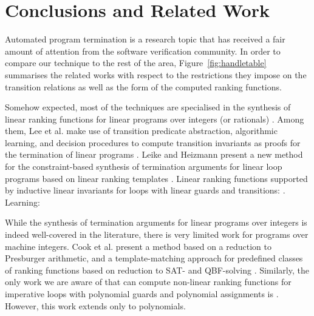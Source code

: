 \documentclass[preprint]{sigplanconf}
\theoremstyle{definition}
\begin{document}
 \section{Conclusions and Related Work}
Automated program termination is a research topic that has received a fair amount of attention from the software verification community.
In order to compare our technique to the rest of the area, 
Figure~\ref{fig:handletable} summarises the related works with respect to the restrictions they impose on the transition relations as well as the form of the computed ranking functions. 


Somehow expected, most of the techniques are specialised in the synthesis of linear ranking functions for linear programs over integers (or rationals) \cite{DBLP:conf/pldi/CookPR06,DBLP:conf/cav/LeeWY12,DBLP:conf/popl/Ben-AmramG13,DBLP:conf/vmcai/P04,DBLP:conf/atva/HeizmannHLP13,DBLP:conf/cav/BradleyMS05,DBLP:conf/tacas/CookSZ13}. 
Among them, 
Lee et al. make use of transition predicate abstraction, algorithmic learning, and decision procedures to compute transition
invariants as proofs for the termination of linear programs \cite{DBLP:conf/cav/LeeWY12}.
Leike and Heizmann present a new method for the constraint-based synthesis
of termination arguments for linear loop programs based on
linear ranking templates \cite{DBLP:conf/tacas/LeikeH14}.
Linear ranking functions supported by inductive linear invariants for loops with linear guards and transitions: \cite{DBLP:conf/cav/BradleyMS05}. 
Learning: \cite{DBLP:journals/corr/HeizmannHP14}



While the synthesis of termination arguments for linear programs over integers is indeed well-covered in the literature, 
there is very limited work for programs over machine integers.
Cook et al. present a method based on a reduction to Presburger
arithmetic, and a template-matching approach for predefined classes of
ranking functions based on reduction to SAT- and QBF-solving \cite{DBLP:conf/tacas/CookKRW10}.
Similarly, the only work we are aware of that can compute non-linear ranking functions  
for imperative loops with polynomial guards and polynomial assignments
is \cite{DBLP:conf/vmcai/BradleyMS05}. However, this work extends only to polynomials.
\end{document}
